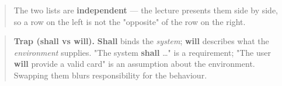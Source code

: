 \begin{studycolumns}
\begin{quote}\small\color{navy}
The two lists are \textbf{independent} --- the lecture presents them side by side, so a row on the left is not the "opposite" of the row on the right.

\end{quote}

\begin{quote}\small\color{navy}
\textbf{Trap (shall vs will).} \textbf{Shall} binds the \emph{system}; \textbf{will} describes what the \emph{environment} supplies. "The system \textbf{shall} \ldots{}" is a requirement; "The user \textbf{will} provide a valid card" is an assumption about the environment. Swapping them blurs responsibility for the behaviour.


\end{quote}
\end{studycolumns}
